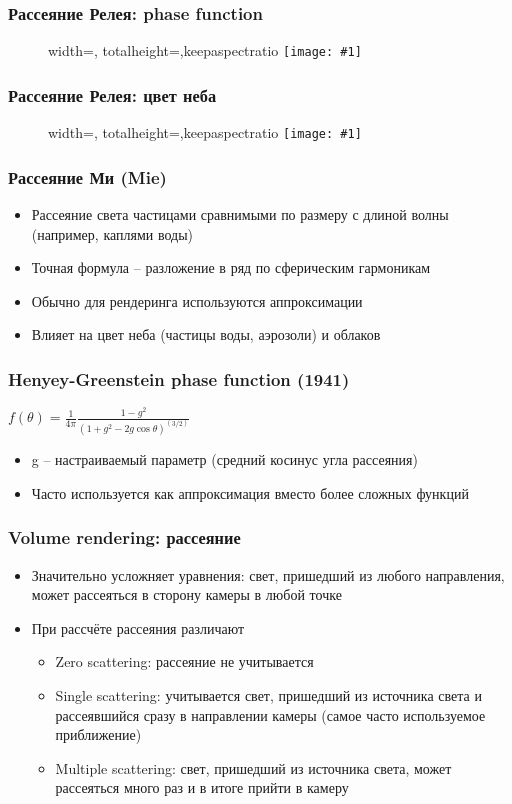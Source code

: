 \documentclass{beamer}
\newcommand{\slideimage}[1]{
  \begin{figure}
    \begin{adjustbox}{width=\textwidth, totalheight=\textheight-2\baselineskip-2\baselineskip,keepaspectratio}
      \texttt{[image: \#1]}
    \end{adjustbox}
  \end{figure}
}
\begin{document}
\begin{frame}[fragile]
\frametitle{Рассеяние Релея: phase function}
\slideimage{rayleigh-phase.png}
\end{frame}

\begin{frame}[fragile]
\frametitle{Рассеяние Релея: цвет неба}
\slideimage{sky.jpg}
\end{frame}

\begin{frame}[fragile]
\frametitle{Рассеяние Ми (Mie)}
\begin{itemize}
\item Рассеяние света частицами сравнимыми по размеру с длиной волны (например, каплями воды)
\pause
\item Точная формула -- разложение в ряд по сферическим гармоникам
\pause
\item Обычно для рендеринга используются аппроксимации
\pause
\item Влияет на цвет неба (частицы воды, аэрозоли) и облаков
\end{itemize}
\end{frame}

\begin{frame}[fragile]
\frametitle{Henyey-Greenstein phase function (1941)}
\begin{math}f(\theta) = \frac{1}{4\pi}\frac{1-g^2}{\left(1+g^2 - 2g\cos\theta\right)^(3/2)}\end{math}
\begin{itemize}
\item g -- настраиваемый параметр (средний косинус угла рассеяния)
\item Часто используется как аппроксимация вместо более сложных функций
\end{itemize}
\end{frame}

\begin{frame}[fragile]
\frametitle{Volume rendering: рассеяние}
\begin{itemize}
\item Значительно усложняет уравнения: свет, пришедший из любого направления, может рассеяться в сторону камеры в любой точке
\pause
\item При рассчёте рассеяния различают
\begin{itemize}
\item Zero scattering: рассеяние не учитывается
\item Single scattering: учитывается свет, пришедший из источника света и рассеявшийся сразу в направлении камеры (самое часто используемое приближение)
\item Multiple scattering: свет, пришедший из источника света, может рассеяться много раз и в итоге прийти в камеру
\end{itemize}
\end{itemize}
\end{frame}
\end{document}
